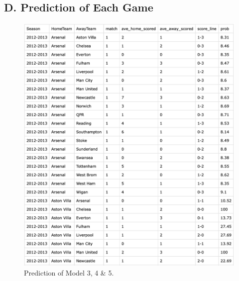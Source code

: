 \documentclass[12pt]{article}
\begin{document}
\newpage
\subsection*{D. Prediction of Each Game}
\label{EachGame}
\begin{figure}[h]
    \centering
    \includegraphics[width=0.8\linewidth]{EG.png}
    \caption{Prediction of Model 3, 4 \& 5.}
\end{figure}
\end{document}
